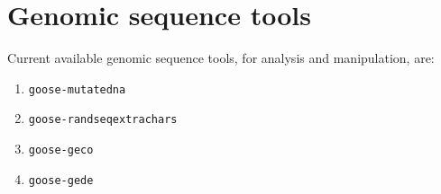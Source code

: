 \chapter{Genomic sequence tools}
\label{gst}

Current available genomic sequence tools, for analysis and manipulation, are:
\begin{enumerate}
\item \texttt{goose-mutatedna}
\item \texttt{goose-randseqextrachars}
\item \texttt{goose-geco}
\item \texttt{goose-gede}
\end{enumerate}


%
%
%
%